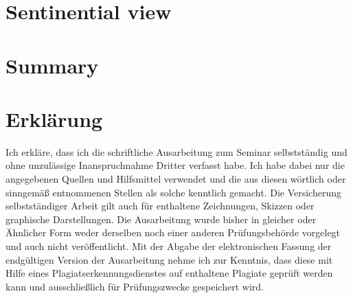 \documentclass[11pt]{scrartcl}
\begin{document}
\section{Sentinential view}

\section{Summary}

\newpage

\typeout{}



\newpage

\section*{Erklärung}
Ich erkläre, dass ich die schriftliche Ausarbeitung zum Seminar selbstständig und ohne unzulässige Inanspruchnahme Dritter verfasst habe. Ich habe dabei nur die angegebenen Quellen und Hilfsmittel verwendet und die aus diesen wörtlich oder sinngemäß entnommenen Stellen als solche kenntlich gemacht. Die Versicherung selbstständiger Arbeit gilt auch für enthaltene Zeichnungen, Skizzen oder graphische Darstellungen. Die Ausarbeitung wurde bisher in gleicher oder Ähnlicher Form weder derselben noch einer anderen Prüfungsbehörde vorgelegt und auch nicht veröffentlicht. Mit der Abgabe der elektronischen Fassung der endgültigen Version der Ausarbeitung nehme ich zur Kenntnis, dass diese mit Hilfe eines Plagiatserkennungsdienstes auf enthaltene Plagiate geprüft werden kann und ausschließlich für Prüfungszwecke gespeichert wird.
\end{document}
